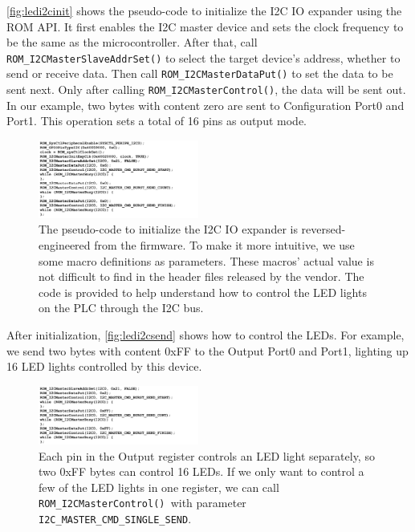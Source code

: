 \autoref{fig:ledi2cinit} shows the pseudo-code to initialize the I2C IO expander using the ROM API. It first enables the I2C master device and sets the clock frequency to be the same as the microcontroller. After that, call \texttt{ROM\_I2CMasterSlaveAddrSet()} to select the target device's address, whether to send or receive data. Then call \texttt{ROM\_I2CMasterDataPut()} to set the data to be sent next. Only after calling \texttt{ROM\_I2CMasterControl()}, the data will be sent out. In our example, two bytes with content zero are sent to Configuration Port0 and Port1. This operation sets a total of 16 pins as output mode.



\begin{figure}[th]
	\includegraphics[width=0.47\textwidth]{figures/ledi2cinit}
	\centering
	\caption{The pseudo-code to initialize the I2C IO expander is reversed-engineered from the firmware. To make it more intuitive, we use some macro definitions as parameters. These macros' actual value is not difficult to find in the header files released by the vendor. The code is provided to help understand how to control the LED lights on the PLC through the I2C bus.}
	\label{fig:ledi2cinit}
\end{figure}



After initialization, \autoref{fig:ledi2csend} shows how to control the LEDs. For example, we send two bytes with content 0xFF to the Output Port0 and Port1, lighting up 16 LED lights controlled by this device.


\begin{figure}[th]
	\includegraphics[width=0.47\textwidth]{figures/ledi2csend}
	\centering
	\caption{Each pin in the Output register controls an LED light separately, so two 0xFF bytes can control 16 LEDs. If we only want to control a few of the LED lights in one register, we can call \texttt{ROM\_I2CMasterControl() }with parameter \texttt{I2C\_MASTER\_CMD\_SINGLE\_SEND}.}
	\label{fig:ledi2csend}
\end{figure}






